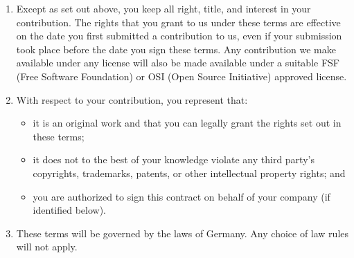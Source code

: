 \documentclass[12pt, a4paper]{article}
\begin{document}
\begin{enumerate}[leftmargin=15pt]
\item Except as set out above, you keep all right, title, and interest
  in your contribution. The rights that you grant to us under these
  terms are effective on the date you first submitted a contribution
  to us, even if your submission took place before the date you sign
  these terms. Any contribution we make available under any license
  will also be made available under a suitable FSF (Free Software
  Foundation) or OSI (Open Source Initiative) approved license.

\item With respect to your contribution, you represent that:
  \begin{itemize}[leftmargin=15pt]
  \item it is an original work and that you can legally grant the
    rights set out in these terms;
  \item it does not to the best of your knowledge violate any third
    party's copyrights, trademarks, patents, or other intellectual
    property rights; and
  \item you are authorized to sign this contract on behalf of your
    company (if identified below).
  \end{itemize}

\item These terms will be governed by the laws of Germany. Any choice
  of law rules will not apply.
\end{enumerate}
\end{document}
